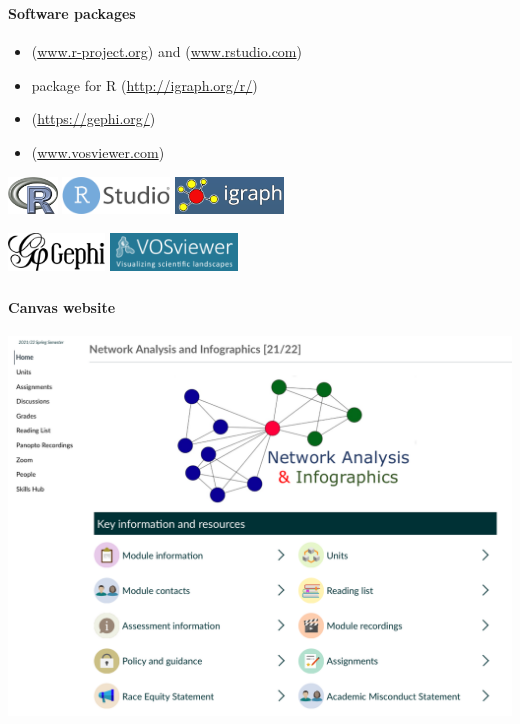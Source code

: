 \documentclass[8pt]{beamer}
\begin{document}
\begin{frame}
\frametitle{\insertsection}
\framesubtitle{Software packages}


\begin{itemize}
	\item {\color{blue}{R}} (\url{www.r-project.org}) and {\color{blue}{R-Studio}} (\url{www.rstudio.com})
	\item {\color{blue}{igraph}} package for R (\url{http://igraph.org/r/})
	\item {\color{blue}{Gephi}} (\url{https://gephi.org/})
	\item {\color{blue}{VOSviewer}} (\url{www.vosviewer.com})
\end{itemize}
\medskip
\medskip

\centering
\includegraphics[height=1cm]{../_shared_pics/r_logo} \hspace{1cm}
\includegraphics[height=1cm]{../_shared_pics/rstudio_logo} \hspace{1cm}
\includegraphics[height=1cm]{../_shared_pics/igraph_logo}
\medskip

\includegraphics[height=1cm]{../_shared_pics/gephi_logo} \hspace{1cm}
\includegraphics[height=1cm]{../_shared_pics/vos_logo} 
\end{frame}


\begin{frame}
\frametitle{\insertsection}
\framesubtitle{Canvas website}
\centering
\includegraphics[width=0.8\linewidth, frame]{canvas}
\end{frame}
\end{document}
